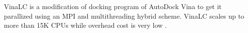 VinaLC is a modification of docking program of AutoDock Vina to get it parallized using an MPI and multithreading hybrid scheme. VinaLC scales up to more than 15K CPUs while overhead cost is very low \cite{Zhang_2013}. 